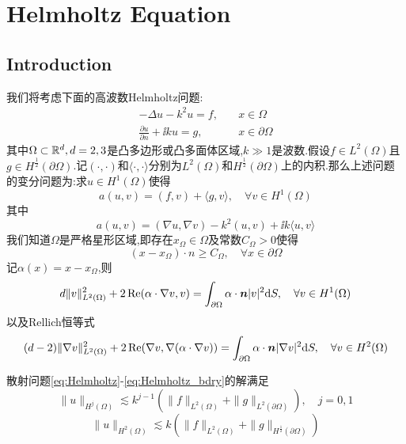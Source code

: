 \section{Helmholtz Equation}
\subsection{Introduction}
我们将考虑下面的高波数Helmholtz问题:
\begin{align}
    -\Delta u-k^2u=f,\quad &x\in\Omega\label{eq:Helmholtz}\\
    \frac{\partial u}{\partial n}+\ii ku=g,\quad &x\in \partial\Omega\label{eq:Helmholtz_bdry}
\end{align}
其中$\Omega\subset\mathbb{R}^d,d=2,3$是凸多边形或凸多面体区域,$k\gg 1$是波数.假设$f\in L^2(\Omega)$且$g\in H^{\frac{1}{2}}(\partial\Omega)$.记$(\cdot,\cdot)$和$\langle\cdot,\cdot\rangle$分别为$L^2(\Omega)$和$H^{\frac{1}{2}}(\partial\Omega)$上的内积.那么上述问题的变分问题为:求$u\in H^1(\Omega)$使得
\begin{equation}\label{eq:varfomular}
    a(u,v)=(f,v)+\langle g,v\rangle,\quad \forall v\in H^1(\Omega)
\end{equation}
其中
$$
a(u,v)=(\nabla u,\nabla v)-k^2(u,v)+\ii k\langle u,v\rangle
$$
\qquad 我们知道$\Omega$是严格星形区域,即存在$x_\Omega\in\Omega$及常数$C_{\Omega}>0$使得
$$
(x-x_\Omega)\cdot n\geqslant C_{\Omega},\quad \forall x\in \partial\Omega
$$
记$\alpha(x)=x-x_{\Omega}$,则
\begin{equation}
    d\|v\|^2_{L^2(\Omega)}+2\operatorname{Re} (\alpha\cdot\nabla v,v)=\int_{\partial\Omega}\alpha\cdot\bm{n}|v|^2\mathrm{d}S,\quad \forall v\in H^1(\Omega)
\end{equation}
以及Rellich恒等式
\begin{equation}\label{eq:Rellich}
    (d-2)\|\nabla v\|^2_{L^2(\Omega)}+2\operatorname{Re} (\nabla v,\nabla(\alpha\cdot\nabla v))=\int_{\partial\Omega}\alpha\cdot\bm{n}|\nabla v|^2\mathrm{d}S,\quad \forall v\in H^2(\Omega)
\end{equation}
\begin{Theorem}{}
散射问题\eqref{eq:Helmholtz}-\eqref{eq:Helmholtz_bdry}的解满足
\begin{equation}\label{eq:2.6}
    \|u\|_{H^j(\Omega)}\lesssim k^{j-1}(\|f\|_{L^2(\Omega)}+\|g\|_{L^2(\partial\Omega)}),\quad j=0,1
\end{equation}
\begin{equation}\label{eq:2.7}
    \|u\|_{H^2(\Omega)}\lesssim k(\|f\|_{L^2(\Omega)}+\|g\|_{H^{\frac{1}{2}}(\partial\Omega)})
\end{equation}
\end{Theorem}
